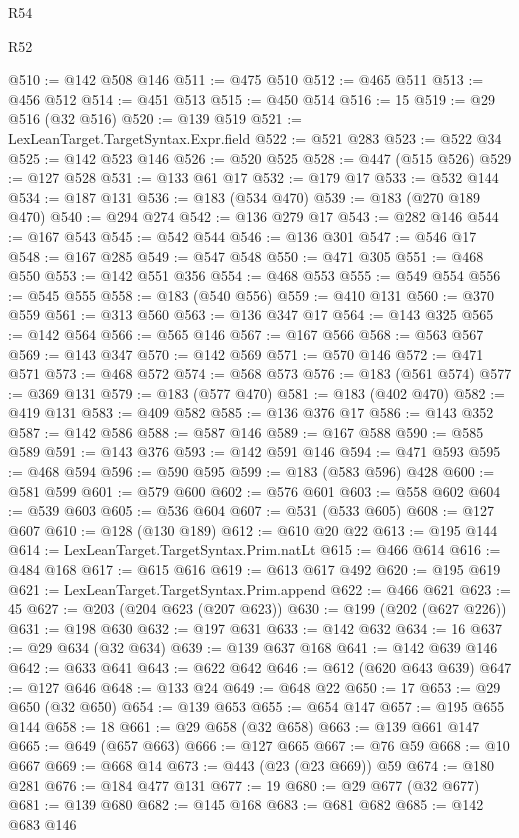 \begin{lexlean}{R54}
\begin{lexlean}{R52}
\begin{coremodule}
{{{{{{{{{{{{{{{{{{{{{{{{{{{{{{{{{{{{{{{{{{{{{{{{{{{{{{{{{{{{{{{{{{{{{{{{{{{{{{{{{{{{{{{{{{{{{{{{{{{{{{{{{{{{{{{{{{{{{{{{{{{{{{{{{{{{{{{{{{{{{{{{{{{{{{{{{{{{{{{{{{{{{{{{{{{{{{{{{{{{{{{{{{{{{{{{{{{{{{@510 := @142 @508 @146
@511 := @475 @510
@512 := @465 @511
@513 := @456 @512
@514 := @451 @513
@515 := @450 @514
@516 := 15
@519 := @29 @516 (@32 @516)
@520 := @139 @519
@521 := LexLeanTarget.TargetSyntax.Expr.field
@522 := @521 @283
@523 := @522 @34
@525 := @142 @523 @146
@526 := @520 @525
@528 := @447 (@515 @526)
@529 := @127 @528
@531 := @133 @61 @17
@532 := @179 @17
@533 := @532 @144
@534 := @187 @131
@536 := @183 (@534 @470)
@539 := @183 (@270 @189 @470)
@540 := @294 @274
@542 := @136 @279 @17
@543 := @282 @146
@544 := @167 @543
@545 := @542 @544
@546 := @136 @301
@547 := @546 @17
@548 := @167 @285
@549 := @547 @548
@550 := @471 @305
@551 := @468 @550
@553 := @142 @551 @356
@554 := @468 @553
@555 := @549 @554
@556 := @545 @555
@558 := @183 (@540 @556)
@559 := @410 @131
@560 := @370 @559
@561 := @313 @560
@563 := @136 @347 @17
@564 := @143 @325
@565 := @142 @564
@566 := @565 @146
@567 := @167 @566
@568 := @563 @567
@569 := @143 @347
@570 := @142 @569
@571 := @570 @146
@572 := @471 @571
@573 := @468 @572
@574 := @568 @573
@576 := @183 (@561 @574)
@577 := @369 @131
@579 := @183 (@577 @470)
@581 := @183 (@402 @470)
@582 := @419 @131
@583 := @409 @582
@585 := @136 @376 @17
@586 := @143 @352
@587 := @142 @586
@588 := @587 @146
@589 := @167 @588
@590 := @585 @589
@591 := @143 @376
@593 := @142 @591 @146
@594 := @471 @593
@595 := @468 @594
@596 := @590 @595
@599 := @183 (@583 @596) @428
@600 := @581 @599
@601 := @579 @600
@602 := @576 @601
@603 := @558 @602
@604 := @539 @603
@605 := @536 @604
@607 := @531 (@533 @605)
@608 := @127 @607
@610 := @128 (@130 @189)
@612 := @610 @20 @22
@613 := @195 @144
@614 := LexLeanTarget.TargetSyntax.Prim.natLt
@615 := @466 @614
@616 := @484 @168
@617 := @615 @616
@619 := @613 @617 @492
@620 := @195 @619
@621 := LexLeanTarget.TargetSyntax.Prim.append
@622 := @466 @621
@623 := 45
@627 := @203 (@204 @623 (@207 @623))
@630 := @199 (@202 (@627 @226))
@631 := @198 @630
@632 := @197 @631
@633 := @142 @632
@634 := 16
@637 := @29 @634 (@32 @634)
@639 := @139 @637 @168
@641 := @142 @639 @146
@642 := @633 @641
@643 := @622 @642
@646 := @612 (@620 @643 @639)
@647 := @127 @646
@648 := @133 @24
@649 := @648 @22
@650 := 17
@653 := @29 @650 (@32 @650)
@654 := @139 @653
@655 := @654 @147
@657 := @195 @655 @144
@658 := 18
@661 := @29 @658 (@32 @658)
@663 := @139 @661 @147
@665 := @649 (@657 @663)
@666 := @127 @665
@667 := @76 @59
@668 := @10 @667
@669 := @668 @14
@673 := @443 (@23 (@23 @669)) @59
@674 := @180 @281
@676 := @184 @477 @131
@677 := 19
@680 := @29 @677 (@32 @677)
@681 := @139 @680
@682 := @145 @168
@683 := @681 @682
@685 := @142 @683 @146
}}}}}}}}}}}}}}}}}}}}}}}}}}}}}}}}}}}}}}}}}}}}}}}}}}}}}}}}}}}}}}}}}}}}}}}}}}}}}}}}}}}}}}}}}}}}}}}}}}}}}}}}}}}}}}}}}}}}}}}}}}}}}}}}}}}}}}}}}}}}}}}}}}}}}}}}}}}}}}}}}}}}}}}}}}}}}}}}}}}}}}}}}}}}}}}}}}}}}}
\end{coremodule}
\end{lexlean}
\end{lexlean}
